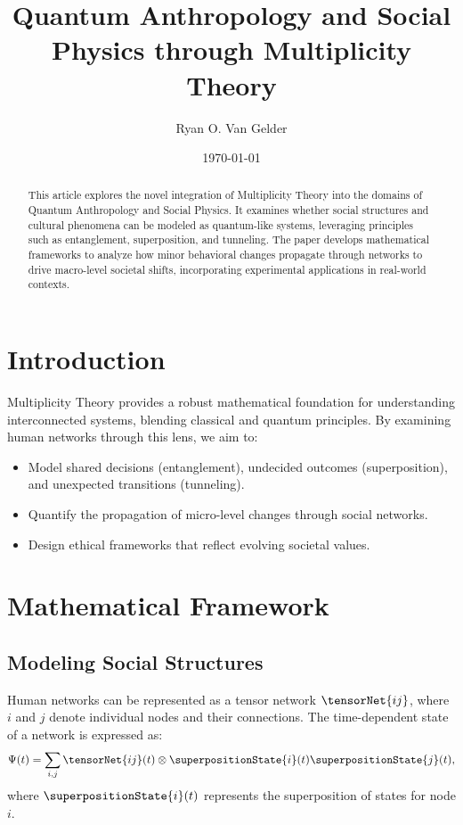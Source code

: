 \documentclass{article}
\theoremstyle{plain}
\begin{document}
\title{Quantum Anthropology and Social Physics through Multiplicity Theory}

\author{Ryan O. Van Gelder}
\date{\today}
\maketitle

\begin{abstract}
This article explores the novel integration of Multiplicity Theory into the domains of Quantum Anthropology and Social Physics. It examines whether social structures and cultural phenomena can be modeled as quantum-like systems, leveraging principles such as entanglement, superposition, and tunneling. The paper develops mathematical frameworks to analyze how minor behavioral changes propagate through networks to drive macro-level societal shifts, incorporating experimental applications in real-world contexts.
\end{abstract}


\section{Introduction}
Multiplicity Theory provides a robust mathematical foundation for understanding interconnected systems, blending classical and quantum principles. By examining human networks through this lens, we aim to:
\begin{itemize}
    \item Model shared decisions (entanglement), undecided outcomes (superposition), and unexpected transitions (tunneling).
    \item Quantify the propagation of micro-level changes through social networks.
    \item Design ethical frameworks that reflect evolving societal values.
\end{itemize}

\section{Mathematical Framework}

\subsection{Modeling Social Structures}
Human networks can be represented as a tensor network \( \tensorNet{ij} \), where \( i \) and \( j \) denote individual nodes and their connections. The time-dependent state of a network is expressed as:
\begin{equation}
    \Psi(t) = \sum_{i,j} \tensorNet{ij}(t) \otimes \superpositionState{i}(t) \superpositionState{j}(t),
\end{equation}
where \( \superpositionState{i}(t) \) represents the superposition of states for node \( i \).
\end{document}
